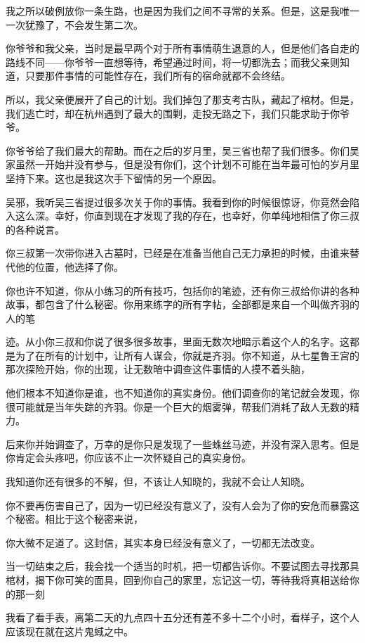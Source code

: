 我之所以破例放你一条生路，也是因为我们之间不寻常的关系。但是，这是我唯一一次犹豫了，不会发生第二次。

你爷爷和我父亲，当时是最早两个对于所有事情萌生退意的人，但是他们各自走的路线不同——你爷爷一直想等待，希望通过时间，将一切都洗去；而我父亲则知道，只要那件事情的可能性存在，我们所有的宿命就都不会终结。

所以，我父亲便展开了自己的计划。我们掉包了那支考古队，藏起了棺材。但是，我们逃亡时，却在杭州遇到了最大的围剿，走投无路之下，我们只能求助于你爷爷。

你爷爷给了我们最大的帮助。而在之后的岁月里，吴三省也帮了我们很多。你们吴家虽然一开始并没有参与，但是没有你们，这个计划不可能在当年最可怕的岁月里坚持下来。这也是我这次手下留情的另一个原因。

吴邪，我听吴三省提过很多次关于你的事情。我看到你的时候很惊讶，你竞然会陷入这么深。幸好，你直到现在才发现了我的存在，也幸好，你单纯地相信了你三叔的各种说言。

你三叔第一次带你进入古墓时，已经是在准备当他自己无力承担的时候，由谁来替代他的位置，他选择了你。

你也许不知道，你从小练习的所有技巧，包括你的笔迹，还有你三叔给你讲的各种故事，都包含了什么秘密。你用来练字的所有字帖，全部都是来自一个叫做齐羽的人的笔

迹。从小你三叔和你说了很多很多故事，里面无数次地暗示着这个人的名字。这都是为了在所有的计划中，让所有人谋会，你就是齐羽。你不知道，从七星鲁王宫的那次探险开始，你的出现，让无数暗中调查这件事情的人摸不着头脑，

他们根本不知道你是谁，也不知道你的真实身份。他们调查你的笔记就会发现，你很可能就是当年失踪的齐羽。你是一个巨大的烟雾弹，帮我们消耗了敌人无数的精力。

后来你并始调查了，万幸的是你只是发现了一些蛛丝马迹，并没有深入思考。但是你肯定会头疼吧，你应该不止一次怀疑自己的真实身份。

我知道你还有很多的不解，但，不该让人知晓的，我就不会让人知晓。

你不要再伤害自己了，因为一切已经没有意义了，没有人会为了你的安危而暴露这个秘密。相比于这个秘密来说，

你大微不足道了。这封信，其实本身已经没有意义了，一切都无法改变。

当一切结束之后，我会找一个适当的时机，把一切都告诉你。不要试图去寻找那具棺材，揭下你可笑的面具，回到你自己的家里，忘记这一切，等待我将真相送给你的那一刻

我看了看手表，离第二天的九点四十五分还有差不多十二个小时，看样子，这个人应该现在就在这片鬼蜮之中。

